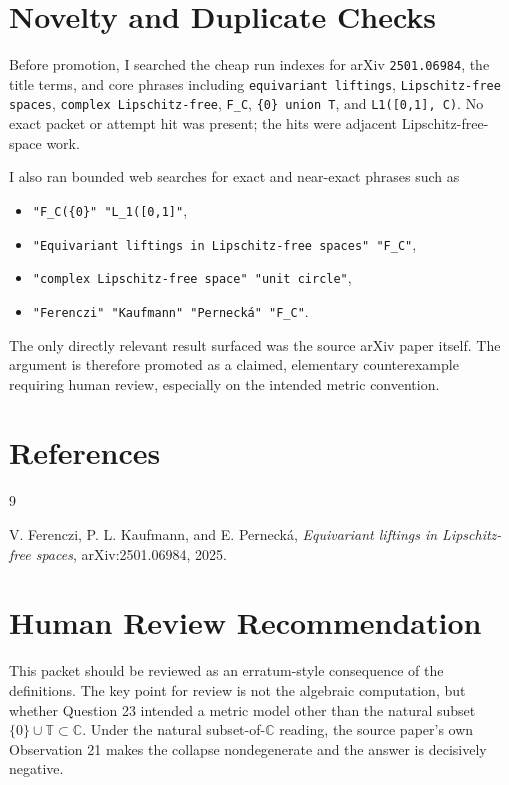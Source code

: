 \documentclass[11pt]{article}
\newcommand{\T}{\mathbb T}
\newcommand{\C}{\mathbb C}
\begin{document}
\section*{Novelty and Duplicate Checks}

Before promotion, I searched the cheap run indexes for arXiv \texttt{2501.06984}, the title
terms, and core phrases including \texttt{equivariant liftings}, \texttt{Lipschitz-free spaces},
\texttt{complex Lipschitz-free}, \texttt{F\_C}, \texttt{\{0\} union T}, and \texttt{L1([0,1], C)}.
No exact packet or attempt hit was present; the hits were adjacent Lipschitz-free-space work.

I also ran bounded web searches for exact and near-exact phrases such as
\begin{itemize}
\item \texttt{"F\_C(\{0\}" "L\_1([0,1]"},
\item \texttt{"Equivariant liftings in Lipschitz-free spaces" "F\_C"},
\item \texttt{"complex Lipschitz-free space" "unit circle"},
\item \texttt{"Ferenczi" "Kaufmann" "Perneck\'a" "F\_C"}.
\end{itemize}
The only directly relevant result surfaced was the source arXiv paper itself.  The argument is
therefore promoted as a claimed, elementary counterexample requiring human review, especially
on the intended metric convention.

\section*{References}

\begin{thebibliography}{9}

V. Ferenczi, P. L. Kaufmann, and E. Perneck\'a,
\emph{Equivariant liftings in Lipschitz-free spaces}, arXiv:2501.06984, 2025.

\end{thebibliography}

\section*{Human Review Recommendation}

This packet should be reviewed as an erratum-style consequence of the definitions.  The key
point for review is not the algebraic computation, but whether Question 23 intended a metric
model other than the natural subset \(\{0\}\cup\T\subset\C\).  Under the natural subset-of-\(\C\)
reading, the source paper's own Observation 21 makes the collapse nondegenerate and the answer
is decisively negative.
\end{document}
